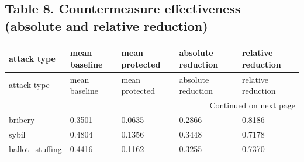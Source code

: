 \documentclass[11pt,a4paper]{article}
\begin{document}
\subsection*{Table 8. Countermeasure effectiveness (absolute and relative reduction)}
{\small
\setlength{\tabcolsep}{3pt}
\begin{longtable}{lllll}
\toprule
attack type & mean baseline & mean protected & absolute reduction & relative reduction \\
\midrule
\endfirsthead
\toprule
attack type & mean baseline & mean protected & absolute reduction & relative reduction \\
\midrule
\endhead
\midrule
\multicolumn{5}{r}{Continued on next page} \\
\midrule
\endfoot
\bottomrule
\endlastfoot
bribery & 0.3501 & 0.0635 & 0.2866 & 0.8186 \\
sybil & 0.4804 & 0.1356 & 0.3448 & 0.7178 \\
ballot\_stuffing & 0.4416 & 0.1162 & 0.3255 & 0.7370 \\
\end{longtable}

}
\vspace{8pt}
\end{document}
